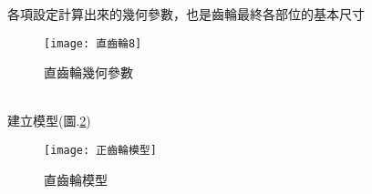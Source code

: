 \begin{itemize}
		\qquad 各項設定計算出來的幾何參數，也是齒輪最終各部位的基本尺寸\\
		\begin{figure}[hbt!]
		\begin{center}
		\texttt{[image: 直齒輪8]}
		\caption{\Large 直齒輪幾何參數}\label{2.23}
		\end{center}
		\end{figure}
		\\
		建立模型(圖.\ref{2.24})\\
		\begin{figure}[hbt!]
		\begin{center}
		\texttt{[image: 正齒輪模型]}
		\caption{\Large 直齒輪模型}\label{2.24}
		\end{center}
		\end{figure}
		\\
		
\newpage
		

\end{itemize}
